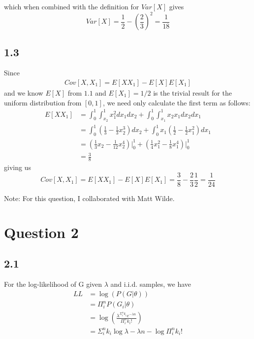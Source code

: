 \documentclass[12pt]{amsart}
\begin{document}
which when combined with the definition for $Var[X]$ gives
\begin{equation}
Var[X] = \frac{1}{2} - \left( \frac{2}{3} \right)^2 = \frac{1}{18}
\end{equation}

\subsection*{1.3}

Since 
\begin{align}
Cov[X,X_1] = E[X X_1] - E[X]E[X_1]
\end{align}
and we know $E[X]$ from $1.1$ and $E[X_1] = 1/2$ is the trivial result for the uniform distribution from $[0,1]$, we need only calculate the first term as follows:
\begin{equation} \label{eqn:1.3}
\begin{split}
E[XX_1] & = \int_0^1 \int_{x_2}^1 x_1^2 dx_1 dx_2 + \int_0^1 \int_{x_1}^1 x_2 x_1 dx_2 dx_1 \\
& = \int_0^1 (\frac{1}{3} - \frac{1}{3}x_2^3) dx_2 + \int_0^1 x_1(\frac{1}{2} - \frac{1}{2}x_1^2) dx_1 \\
& = (\frac{1}{3}x_2 - \frac{1}{12}x_2^4) \vert_0^1 + (\frac{1}{4}x_1^2 - \frac{1}{8}x_1^4) \vert_0^1 \\
& = \frac{3}{8} 
\end{split}
\end{equation}
giving us
\begin{equation}
Cov[X,X_1] = E[X X_1] - E[X]E[X_1] = \frac{3}{8} - \frac{2}{3}\frac{1}{2} = \frac{1}{24}
\end{equation}

Note: For this question, I collaborated with Matt Wilde.

\section*{Question 2}

\subsection*{2.1}

For the log-likelihood of G given $\lambda$ and i.i.d. samples, we have
\begin{equation} \label{eqn:2.1}
\begin{split}
LL & = \log \left( P(G | \theta)  \right) \\
& = \Pi_i^n P(G_i | \theta) \\
& = \log \left( \frac{\lambda^{\Sigma_i^n k_i} e^{-\lambda n}}{\Pi_i^n k_i !} \right) \\
& = \Sigma_i^n k_i \log \lambda - \lambda n - \log \Pi_i^n k_i !
\end{split}
\end{equation}
\end{document}
